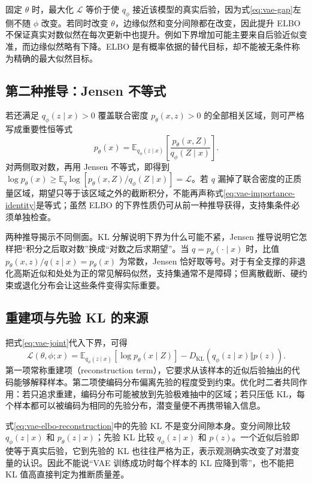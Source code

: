 \documentclass[UTF8,12pt,a4paper,fontset=fandol]{ctexart}
\begin{document}
固定 $\theta$ 时，最大化 $\mathcal L$ 等价于使 $q_\phi$ 接近该模型的真实后验，因为式\eqref{eq:vae-gap}左侧不随 $\phi$ 改变。若同时改变 $\theta$，边缘似然和变分间隙都在改变，因此提升 ELBO 不保证真实对数似然在每次更新中也提升。例如下界增加可能主要来自后验近似变准，而边缘似然略有下降。ELBO 是有概率依据的替代目标，却不能被无条件称为精确的最大似然目标。

\subsection{第二种推导：Jensen 不等式}
若还满足 $q_\phi(z\mid x)>0$ 覆盖联合密度 $p_\theta(x,z)>0$ 的全部相关区域，则可严格写成重要性恒等式
\begin{equation}
 p_\theta(x)=\mathbb E_{q_\phi(z\mid x)}
       \left[\frac{p_\theta(x,Z)}{q_\phi(Z\mid x)}\right].
 \label{eq:vae-importance-identity}
\end{equation}
对两侧取对数，再用 Jensen 不等式，即得到 $\log p_\theta(x)\geq\mathbb E_q\log[p_\theta(x,Z)/q_\phi(Z\mid x)]=\mathcal L$。若 $q$ 漏掉了联合密度的正质量区域，期望只等于该区域之外的截断积分，不能再声称式\eqref{eq:vae-importance-identity}是等式；虽然 ELBO 的下界性质仍可从前一种推导获得，支持集条件必须单独检查。

两种推导揭示不同侧面。KL 分解说明下界为什么可能不紧，Jensen 推导说明它怎样把“积分之后取对数”换成“对数之后求期望”。当 $q=p_\theta(\cdot\mid x)$ 时，比值 $p_\theta(x,z)/q(z\mid x)=p_\theta(x)$ 为常数，Jensen 恰好取等号。对于有全支撑的非退化高斯近似和处处为正的常见解码似然，支持集通常不是障碍；但离散截断、硬约束或退化分布会让这些条件变得实际重要。

\subsection{重建项与先验 KL 的来源}
把式\eqref{eq:vae-joint}代入下界，可得
\begin{equation}
 \mathcal L(\theta,\phi;x)
 =\mathbb E_{q_\phi(z\mid x)}[\log p_\theta(x\mid Z)]
  -D_{\mathrm{KL}}(q_\phi(z\mid x)\Vert p(z)).
 \label{eq:vae-elbo-reconstruction}
\end{equation}
第一项常称重建项（reconstruction term），它要求从该样本的近似后验抽出的代码能够解释样本。第二项使编码分布偏离先验的程度受到约束。优化时二者共同作用：若只追求重建，编码分布可能被放到先验极难抽中的区域；若只压低 KL，每个样本都可以被编码为相同的先验分布，潜变量便不再携带输入信息。

式\eqref{eq:vae-elbo-reconstruction}中的先验 KL 不是变分间隙本身。变分间隙比较 $q_\phi(z\mid x)$ 和 $p_\theta(z\mid x)$；先验 KL 比较 $q_\phi(z\mid x)$ 和 $p(z)$。一个近似后验即使等于真实后验，它到先验的 KL 也往往严格为正，表示观测确实改变了对潜变量的认识。因此不能说“VAE 训练成功时每个样本的 KL 应降到零”，也不能把 KL 值高直接判定为推断质量差。
\end{document}
